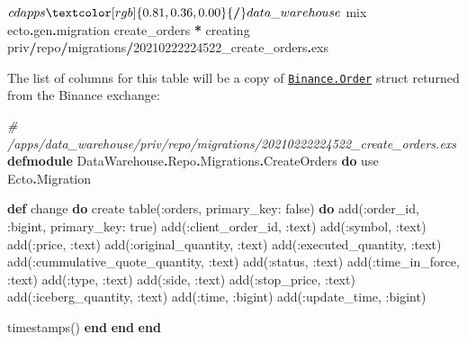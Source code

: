 \documentclass[
  oneside]{book}
\newenvironment{Shaded}{\begin{snugshade}}{\end{snugshade}}
\newcommand{\CommentTok}[1]{\textcolor[rgb]{0.56,0.35,0.01}{\textit{#1}}}
\newcommand{\ConstantTok}[1]{\textcolor[rgb]{0.00,0.00,0.00}{#1}}
\newcommand{\DecValTok}[1]{\textcolor[rgb]{0.00,0.00,0.81}{#1}}
\newcommand{\ImportTok}[1]{#1}
\newcommand{\KeywordTok}[1]{\textcolor[rgb]{0.13,0.29,0.53}{\textbf{#1}}}
\newcommand{\NormalTok}[1]{#1}
\newcommand{\OperatorTok}[1]{\textcolor[rgb]{0.81,0.36,0.00}{\textbf{#1}}}
\newcommand{\VariableTok}[1]{\textcolor[rgb]{0.00,0.00,0.00}{#1}}
\begin{document}
\begin{Shaded}
\begin{Highlighting}[]
\NormalTok{$ cd apps}\OperatorTok{/}\NormalTok{data\_warehouse}
\NormalTok{$ mix ecto}\OperatorTok{.}\NormalTok{gen}\OperatorTok{.}\NormalTok{migration create\_orders}
\OperatorTok{*}\NormalTok{ creating priv}\OperatorTok{/}\NormalTok{repo}\OperatorTok{/}\NormalTok{migrations}\OperatorTok{/}\DecValTok{2}\NormalTok{0210222224522\_create\_orders}\OperatorTok{.}\NormalTok{exs}
\end{Highlighting}
\end{Shaded}

The list of columns for this table will be a copy of \href{https://github.com/dvcrn/binance.ex/blob/master/lib/binance/order.ex}{\texttt{Binance.Order}} struct returned from the Binance exchange:

\begin{Shaded}
\begin{Highlighting}[]
\CommentTok{\# /apps/data\_warehouse/priv/repo/migrations/20210222224522\_create\_orders.exs}
\KeywordTok{defmodule} \ConstantTok{DataWarehouse}\OperatorTok{.}\ConstantTok{Repo}\OperatorTok{.}\ConstantTok{Migrations}\OperatorTok{.}\ConstantTok{CreateOrders} \KeywordTok{do}
  \ImportTok{use} \ConstantTok{Ecto}\OperatorTok{.}\ConstantTok{Migration}

  \KeywordTok{def}\NormalTok{ change }\KeywordTok{do}
\NormalTok{    create table(}\VariableTok{:orders}\NormalTok{, }\VariableTok{primary\_key:} \ConstantTok{false}\NormalTok{) }\KeywordTok{do}
\NormalTok{      add(}\VariableTok{:order\_id}\NormalTok{, }\VariableTok{:bigint}\NormalTok{, }\VariableTok{primary\_key:} \ConstantTok{true}\NormalTok{)}
\NormalTok{      add(}\VariableTok{:client\_order\_id}\NormalTok{, }\VariableTok{:text}\NormalTok{)}
\NormalTok{      add(}\VariableTok{:symbol}\NormalTok{, }\VariableTok{:text}\NormalTok{)}
\NormalTok{      add(}\VariableTok{:price}\NormalTok{, }\VariableTok{:text}\NormalTok{)}
\NormalTok{      add(}\VariableTok{:original\_quantity}\NormalTok{, }\VariableTok{:text}\NormalTok{)}
\NormalTok{      add(}\VariableTok{:executed\_quantity}\NormalTok{, }\VariableTok{:text}\NormalTok{)}
\NormalTok{      add(}\VariableTok{:cummulative\_quote\_quantity}\NormalTok{, }\VariableTok{:text}\NormalTok{)}
\NormalTok{      add(}\VariableTok{:status}\NormalTok{, }\VariableTok{:text}\NormalTok{)}
\NormalTok{      add(}\VariableTok{:time\_in\_force}\NormalTok{, }\VariableTok{:text}\NormalTok{)}
\NormalTok{      add(}\VariableTok{:type}\NormalTok{, }\VariableTok{:text}\NormalTok{)}
\NormalTok{      add(}\VariableTok{:side}\NormalTok{, }\VariableTok{:text}\NormalTok{)}
\NormalTok{      add(}\VariableTok{:stop\_price}\NormalTok{, }\VariableTok{:text}\NormalTok{)}
\NormalTok{      add(}\VariableTok{:iceberg\_quantity}\NormalTok{, }\VariableTok{:text}\NormalTok{)}
\NormalTok{      add(}\VariableTok{:time}\NormalTok{, }\VariableTok{:bigint}\NormalTok{)}
\NormalTok{      add(}\VariableTok{:update\_time}\NormalTok{, }\VariableTok{:bigint}\NormalTok{)}

\NormalTok{      timestamps()}
    \KeywordTok{end}
  \KeywordTok{end}
\KeywordTok{end}
\end{Highlighting}
\end{Shaded}
\end{document}
